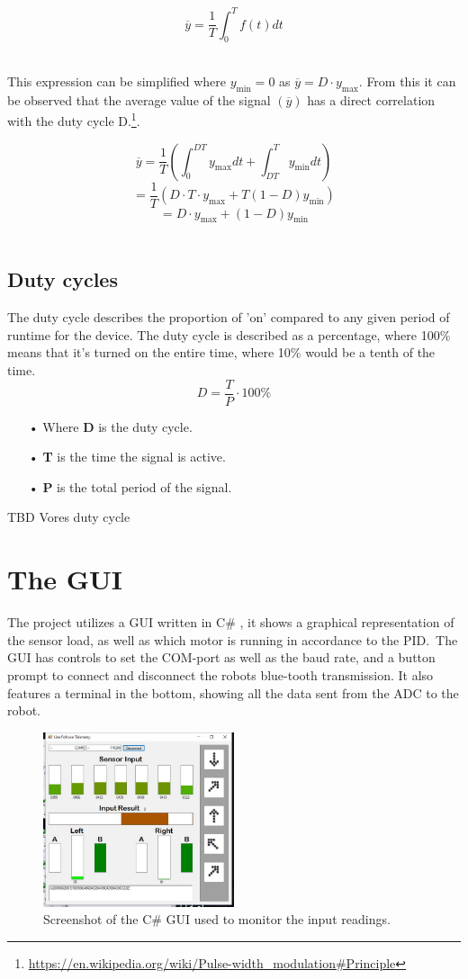 $$\overline{y}=\frac{1}{T}\int_{0}^{T}f(t)dt$$\

This expression can be simplified where $y_\mathrm{min}=0$ as $\overline{y}=D \cdot y_\mathrm{max}$. From this it can be observed that the average value of the signal $(\overline{y})$ has a direct correlation with the duty cycle D.\footnote{\url{https://en.wikipedia.org/wiki/Pulse-width_modulation\#Principle}}.
 
 $$\overline{y}=\frac{1}{T}\left(\int_{0}^{DT}y_\mathrm{max}dt+\int_{DT}^{T}y_\mathrm{min}dt\right)$$
 $$=\frac{1}{T}\left(D \cdot T \cdot y_\mathrm{max}+T(1-D)y_\mathrm{min}\right)$$
 $$=D \cdot y_\mathrm{max}+\left(1-D\right)y_\mathrm{min}$$\
  

\subsection{Duty cycles}
The duty cycle describes the proportion of 'on' compared to any given period of runtime for the device. The duty cycle is described as a percentage, where 100\% means that it's turned on the entire time, where 10\% would be a tenth of the time.\\
$${D}=\frac{T}{P} \cdot 100\%$$ 

\begin{enumerate}
\item[•]Where {\textbf{D}} is the duty cycle. 
\item[•]{\textbf{T}} is the time the signal is active.
\item[•]{\textbf{P}} is the total period of the signal.
\end{enumerate}
TBD Vores duty cycle



\section{The GUI}
The project utilizes a GUI written in C\# , it shows a graphical representation of the sensor load, as well as which motor is running in accordance to the PID.\
The GUI has controls to set the COM-port as well as the baud rate, and a button prompt to connect and disconnect the robots blue-tooth transmission. It also features a terminal in the bottom, showing all the data sent from the ADC to the robot.

\begin{figure}[h!]
  \centering
  \includegraphics[width=0.5\textwidth]{figures/guiexample.png}  
\caption{Screenshot of the C\# GUI used to monitor the input readings.}  
  \label{The GUI}
\end{figure}